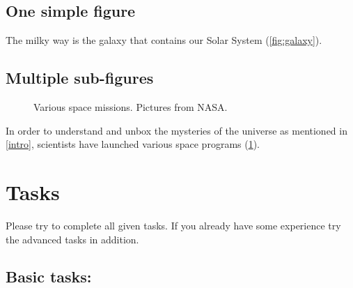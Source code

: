 \documentclass{article}
\begin{document}
\subsection{One simple figure}
The milky way is the galaxy that contains our Solar System (\cref{fig:galaxy}).

\subsection{Multiple sub-figures}


\begin{figure}[t]%
    \centering
    \qquad
    \caption{Various space missions. Pictures from NASA.}%
    \label{fig:space}%
\end{figure}



In order to understand and unbox the mysteries of the universe as mentioned in \cref{intro}, scientists have launched various space programs (\cref{fig:space}).

\section{Tasks}

Please try to complete all given tasks. If you already have some experience try the advanced tasks in addition.

\subsection{Basic tasks:}
\end{document}
